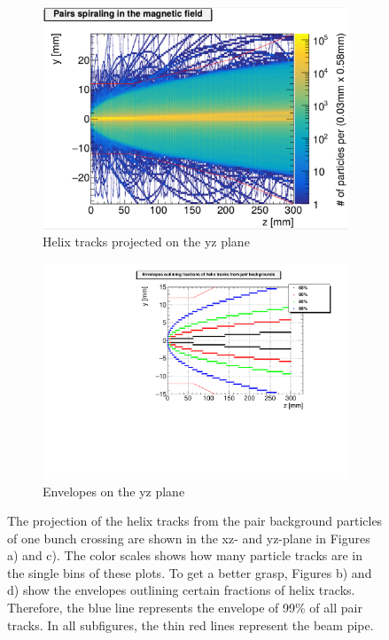 \begin{figure}
\begin{subfigure}[b]{0.49\textwidth}
    \centering
        \includegraphics[height=0.26\textheight]{figures/Helix_tracks_yz_1bunch_lowres.pdf}
        \caption{Helix tracks projected on the yz plane}
	\label{fig:helix_yz}
    \end{subfigure}
    \begin{subfigure}[b]{0.49\textwidth}
    \centering
        \includegraphics[height=0.26\textheight]{figures/HelixEnvelopes_yz.pdf}
        \caption{Envelopes on the yz plane}
        \label{fig:envelopes_yz}
    \end{subfigure}
    \caption[Helix tracks and their envelopes]{
    The projection of the helix tracks from the pair background particles of one bunch crossing are shown in the xz- and yz-plane in Figures a) and c).
    The color scales shows how many particle tracks are in the single bins of these plots.
    To get a better grasp, Figures b) and d) show the envelopes outlining certain fractions of helix tracks.
    Therefore, the blue line represents the envelope of 99\% of all pair tracks.
    In all subfigures, the thin red lines represent the beam pipe.
    }
    \label{fig:Helixes}
\end{figure}

